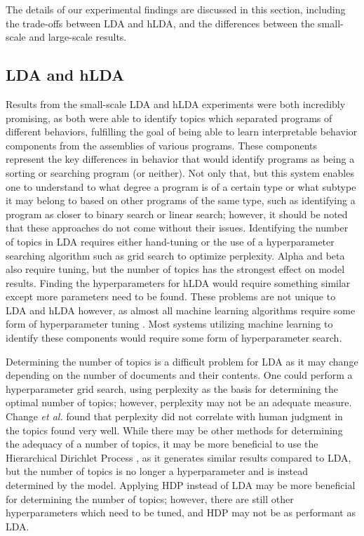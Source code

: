 The details of our experimental findings are discussed in this section, including the trade-offs between LDA and hLDA, and the differences between the small-scale and large-scale results.

\subsection{LDA and hLDA}
Results from the small-scale LDA and hLDA experiments were both incredibly promising, as both were able to identify topics which separated programs of different behaviors, fulfilling the goal of being able to learn interpretable behavior components from the assemblies of various programs. These components represent the key differences in behavior that would identify programs as being a sorting or searching program (or neither). Not only that, but this system enables one to understand to what degree a program is of a certain type or what subtype it may belong to based on other programs of the same type, such as identifying a program as closer to binary search or linear search; however, it should be noted that these approaches do not come without their issues. Identifying the number of topics in LDA requires either hand-tuning or the use of a hyperparameter searching algorithm such as grid search to optimize perplexity. Alpha and beta also require tuning, but the number of topics has the strongest effect on model results. Finding the hyperparameters for hLDA would require something similar except more parameters need to be found. These problems are not unique to LDA and hLDA however, as almost all machine learning algorithms require some form of hyperparameter tuning \cite{hype}. Most systems utilizing machine learning to identify these components would require some form of hyperparameter search.

Determining the number of topics is a difficult problem for LDA as it may change depending on the number of documents and their contents. One could perform a hyperparameter grid search, using perplexity as the basis for determining the optimal number of topics; however, perplexity may not be an adequate measure. Change \textit{et al.} \cite{chang2009reading} found that perplexity did not correlate with human judgment in the topics found very well. While there may be other methods for determining the adequacy of a number of topics, it may be more beneficial to use the Hierarchical Dirichlet Process \cite{teh2005sharing}, as it generates similar results compared to LDA, but the number of topics is no longer a hyperparameter and is instead determined by the model. Applying HDP instead of LDA may be more beneficial for determining the number of topics; however, there are still other hyperparameters which need to be tuned, and HDP may not be as performant as LDA.

